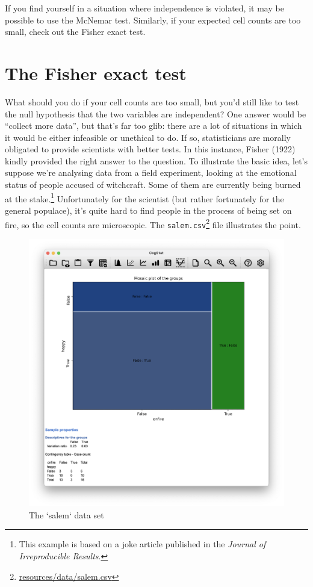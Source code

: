 \documentclass[
  11pt,
  a4paper,
  twoside,symmetric,openright]{book}
\theoremstyle{break}
\theoremstyle{break}
\DeclareRobustCommand{\href}[2]{#2\footnote{\url{#1}}}
\begin{document}
If you find yourself in a situation where independence is violated, it may be possible to use the McNemar test. Similarly, if your expected cell counts are too small, check out the Fisher exact test.

\section{The Fisher exact test}\label{fisherexacttest}

What should you do if your cell counts are too small, but you'd still like to test the null hypothesis that the two variables are independent? One answer would be ``collect more data'', but that's far too glib: there are a lot of situations in which it would be either infeasible or unethical to do. If so, statisticians are morally obligated to provide scientists with better tests. In this instance, Fisher (1922) kindly provided the right answer to the question. To illustrate the basic idea, let's suppose we're analysing data from a field experiment, looking at the emotional status of people accused of witchcraft. Some of them are currently being burned at the stake.\footnote{This example is based on a joke article published in the \emph{Journal of Irreproducible Results}.} Unfortunately for the scientist (but rather fortunately for the general populace), it's quite hard to find people in the process of being set on fire, so the cell counts are microscopic. The \href{resources/data/salem.csv}{\texttt{salem.csv}} file illustrates the point.

\begin{figure}

{\centering \includegraphics[width=0.6\linewidth]{resources/image/cogstatsalemload} 

}

\caption{The `salem` data set}\label{fig:cogstatsalemload}
\end{figure}
\end{document}
